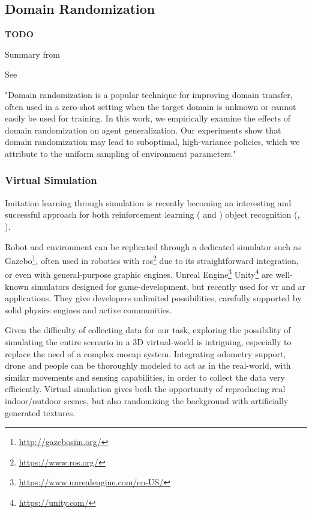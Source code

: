 \subsection{Domain Randomization}
\label{subsec:domain-randomization}

\textbf{TODO}

Summary from \cite{mehta2019active}

See \cite{weng2019DR_explanation}
 
"Domain randomization is a popular technique for improving domain transfer, often used in a zero-shot setting when the target domain is unknown or cannot easily be used for training. In this work, we empirically examine the effects of domain randomization on agent generalization. Our experiments show that domain randomization may lead to suboptimal, high-variance policies, which we attribute to the uniform sampling of environment parameters."


\subsubsection{Virtual Simulation}
\label{subsec:virtual-simulation}

Imitation learning through simulation is recently becoming an interesting and successful approach for both reinforcement learning (\cite{imitation_learning_survey} and \cite{imitation_learning_3d_navigation}) object recognition (\cite{tobin2017domain}, \cite{weng2019DR}).

Robot and environment can be replicated through a dedicated simulator such as Gazebo\footnote{\url{http://gazebosim.org/}}, often used in robotics with \gls{ros}\footnote{\url{https://www.ros.org/}} due to its straightforward integration, or even with general-purpose graphic engines. Unreal Engine\footnote{\url{https://www.unrealengine.com/en-US/}} Unity\footnote{\url{https://unity.com/}} are well-known simulators designed for game-development, but recently used for \gls{vr} and \gls{ar} applications. They give developers unlimited possibilities, carefully supported by solid physics engines and active communities.

\medskip

Given the difficulty of collecting data for our task, exploring the possibility of simulating the entire scenario in a 3D virtual-world is intriguing, especially to replace the need of a complex \gls{mocap} system. Integrating odometry support, drone and people can be thoroughly modeled to act as in the real-world, with similar movements and sensing capabilities, in order to collect the data very efficiently. Virtual simulation gives both the opportunity of reproducing real indoor/outdoor scenes, but also randomizing the background with artificially generated textures.

